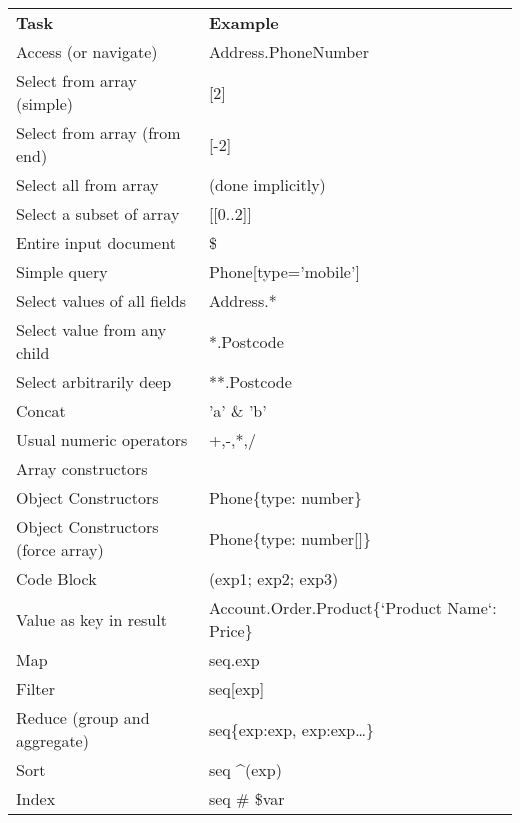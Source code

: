 \documentclass[9pt,letterpaper]{article}
\begin{document}
\begin{table}[H]
\begin{tabular}{l | l }
\textbf{Task}                       & \textbf{Example}       \\ \hhline{=|=}
Access (or navigate)                & Address.PhoneNumber    \\
Select from array (simple)          & {[}2{]}                \\
Select from array (from end)        & {[}-2{]}               \\
Select all from array               & (done implicitly)      \\
Select a subset of array            & {[}{[}0..2{]}{]}       \\
Entire input document               & \$                     \\
Simple query                        & Phone{[}type='mobile'{]} \\
Select values of all fields         & Address.*                \\
Select value from any child         & *.Postcode               \\
Select arbitrarily deep             & **.Postcode              \\
Concat                              & 'a' \& 'b'               \\
Usual numeric operators             &  +,-,*,/                 \\
Array constructors                  &                          \\
Object Constructors                 & Phone\{type: number\}    \\
Object Constructors (force array)   & Phone\{type: number{[}{]}\} \\
Code Block                          & (exp1; exp2; exp3)          \\
Value as key in result              & Account.Order.Product\{`Product Name`: Price\} \\
Map                                 & seq.exp                                        \\
Filter                              & seq{[}exp{]}                                   \\
Reduce (group and aggregate)        & seq\{exp:exp, exp:exp…\}                       \\
Sort                                & seq \textasciicircum (exp)                     \\
Index                               & seq \# \$var                                   \\

\end{tabular}
\end{table}
\end{document}
